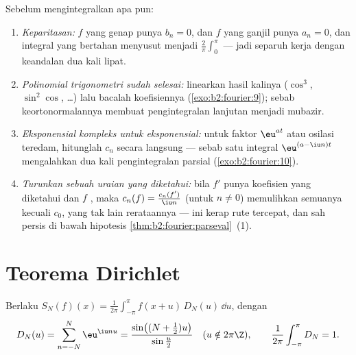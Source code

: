 \begin{method}\label{met:b2:fourier:coefficients}
Sebelum mengintegralkan apa pun:
\begin{enumerate}
  \item \emph{Keparitasan:} $f$ yang genap punya $b_n = 0$, dan $f$ yang ganjil punya
        $a_n = 0$, dan integral yang bertahan menyusut menjadi $\frac2\pi
        \int_0^\pi$ --- jadi separuh kerja dengan keandalan dua kali lipat.
  \item \emph{Polinomial trigonometri sudah selesai:}
        linearkan hasil kalinya ($\cos^3$, $\sin^2\cos$, \dots) lalu
        bacalah koefisiennya
        (\cref{exo:b2:fourier:9}); sebab keortonormalannya membuat
        pengintegralan lanjutan menjadi mubazir.
  \item \emph{Eksponensial kompleks untuk eksponensial:} untuk
        faktor $\eu^{at}$ atau osilasi teredam, hitunglah
        $c_n$ secara langsung --- sebab satu integral $\eu^{(a - \iu
        n)t}$ mengalahkan dua kali pengintegralan parsial
        (\cref{exo:b2:fourier:10}).
  \item \emph{Turunkan sebuah uraian yang diketahui:} bila $f'$ punya
        koefisien yang diketahui dan $f$ , maka $c_n(f) =
        \frac{c_n(f')}{\iu n}$ (untuk $n \neq 0$) memulihkan semuanya kecuali
        $c_0$, yang tak lain rerataannya --- ini kerap rute tercepat,
        dan sah persis di bawah hipotesis
        \cref{thm:b2:fourier:parseval}~(1).
\end{enumerate}
\end{method}

\section{Teorema Dirichlet}

\begin{lemma}\label{lem:b2:fourier:kernel}
Berlaku $S_N(f)(x) = \frac{1}{2\pi}\int_{-\pi}^{\pi} f(x + u)\,D_N(u)\,\dd
u$, dengan
\[
D_N(u) = \sum_{n=-N}^{N} \eu^{\iu nu}
= \frac{\sin\bigl((N + \frac12)u\bigr)}{\sin\frac u2}
\quad (u \notin 2\pi\Z),
\qquad
\frac{1}{2\pi}\int_{-\pi}^{\pi} D_N = 1 .
\]
\end{lemma}

